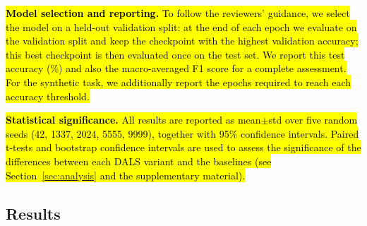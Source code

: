 \documentclass[a4paper,fleqn]{cas-dc}
\begin{document}
\hl{\textbf{Model selection and reporting.} To follow the reviewers' guidance, we select the model on a held-out validation split: at the end of each epoch we evaluate on the validation split and keep the checkpoint with the highest validation accuracy; this best checkpoint is then evaluated once on the test set. We report this test accuracy (\%) and also the macro-averaged F1 score for a complete assessment. For the synthetic task, we additionally report the epochs required to reach each accuracy threshold.}

\hl{\textbf{Statistical significance.} All results are reported as mean$\pm$std over five random seeds (42, 1337, 2024, 5555, 9999), together with 95\% confidence intervals. Paired t-tests and bootstrap confidence intervals are used to assess the significance of the differences between each DALS variant and the baselines (see Section~\ref{sec:analysis} and the supplementary material).}

\subsection{Results}
\end{document}
